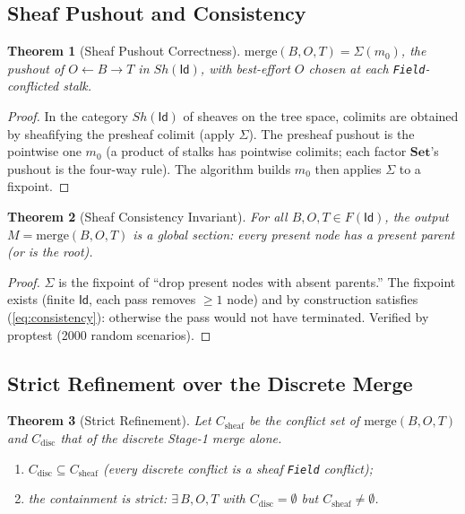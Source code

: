 \documentclass[11pt,a4paper]{article}
\newtheorem{theorem}{Theorem}
\newcommand{\Id}{\mathsf{Id}}
\begin{document}
\subsection{Sheaf Pushout and Consistency}

\begin{theorem}[Sheaf Pushout Correctness]
\label{thm:pushout}
$\mathrm{merge}(B,O,T) = \Sigma(m_0)$, the pushout of $O \leftarrow B
\rightarrow T$ in $Sh(\Id)$, with best-effort $O$ chosen at each
\texttt{Field}-conflicted stalk.
\end{theorem}

\begin{proof}
In the category $Sh(\Id)$ of sheaves on the tree space, colimits are obtained
by sheafifying the presheaf colimit (apply $\Sigma$). The presheaf pushout is
the pointwise one $m_0$ (a product of stalks has pointwise colimits; each
factor $\mathbf{Set}$'s pushout is the four-way rule). The algorithm builds
$m_0$ then applies $\Sigma$ to a fixpoint.
\end{proof}

\begin{theorem}[Sheaf Consistency Invariant]
\label{thm:consistency}
For all $B, O, T \in F(\Id)$, the output $M = \mathrm{merge}(B,O,T)$ is a
global section: every present node has a present parent (or is the root).
\end{theorem}

\begin{proof}
$\Sigma$ is the fixpoint of ``drop present nodes with absent parents.''
The fixpoint exists (finite $\Id$, each pass removes $\geq 1$ node) and by
construction satisfies (\ref{eq:consistency}): otherwise the pass would
not have terminated. Verified by proptest (2000 random scenarios).
\end{proof}

\subsection{Strict Refinement over the Discrete Merge}

\begin{theorem}[Strict Refinement]
\label{thm:strict}
Let $C_{\text{sheaf}}$ be the conflict set of $\mathrm{merge}(B,O,T)$ and
$C_{\text{disc}}$ that of the discrete Stage-1 merge alone.
\begin{enumerate}[noitemsep]
\item[(a)] $C_{\text{disc}} \subseteq C_{\text{sheaf}}$ (every discrete
  conflict is a sheaf \texttt{Field} conflict);
\item[(b)] the containment is strict: $\exists\, B,O,T$ with
  $C_{\text{disc}} = \emptyset$ but $C_{\text{sheaf}} \neq \emptyset$.
\end{enumerate}
\end{theorem}
\end{document}
